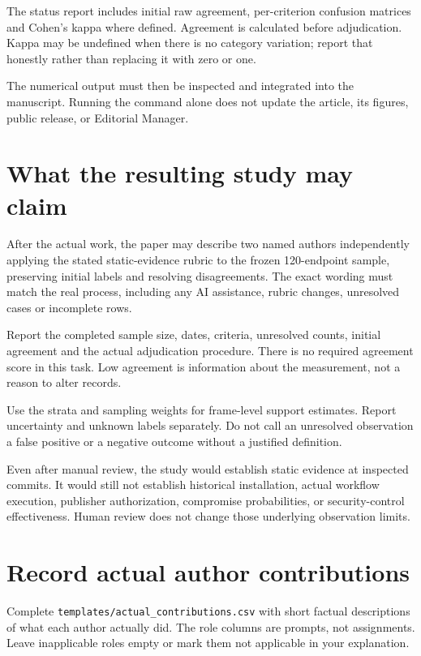 \documentclass[11pt,a4paper]{article}
\begin{document}
The status report includes initial raw agreement, per-criterion confusion matrices and Cohen's kappa where defined. Agreement is calculated before adjudication. Kappa may be undefined when there is no category variation; report that honestly rather than replacing it with zero or one.


The numerical output must then be inspected and integrated into the manuscript. Running the command alone does not update the article, its figures, public release, or Editorial Manager.


\section{What the resulting study may claim}


After the actual work, the paper may describe two named authors independently applying the stated static-evidence rubric to the frozen 120-endpoint sample, preserving initial labels and resolving disagreements. The exact wording must match the real process, including any AI assistance, rubric changes, unresolved cases or incomplete rows.


Report the completed sample size, dates, criteria, unresolved counts, initial agreement and the actual adjudication procedure. There is no required agreement score in this task. Low agreement is information about the measurement, not a reason to alter records.


Use the strata and sampling weights for frame-level support estimates. Report uncertainty and unknown labels separately. Do not call an unresolved observation a false positive or a negative outcome without a justified definition.


Even after manual review, the study would establish static evidence at inspected commits. It would still not establish historical installation, actual workflow execution, publisher authorization, compromise probabilities, or security-control effectiveness. Human review does not change those underlying observation limits.


\section{Record actual author contributions}


Complete \nolinkurl{templates/actual_contributions.csv} with short factual descriptions of what each author actually did. The role columns are prompts, not assignments. Leave inapplicable roles empty or mark them not applicable in your explanation.
\end{document}
